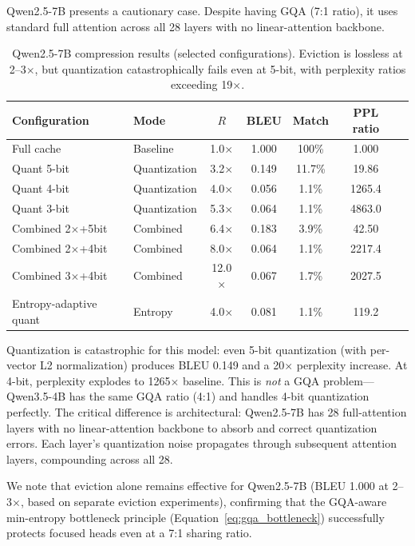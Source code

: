 \documentclass[11pt]{article}
\begin{document}
Qwen2.5-7B presents a cautionary case.  Despite having GQA (7:1 ratio), it uses standard full attention across all 28 layers with no linear-attention backbone.

\begin{table}[htbp]
\centering
\caption{Qwen2.5-7B compression results (selected configurations).  Eviction is lossless at 2--3$\times$, but quantization catastrophically fails even at 5-bit, with perplexity ratios exceeding 19$\times$.}
\label{tab:qwen25_results}
\begin{tabular}{@{}llccccc@{}}
\toprule
Configuration & Mode & $R$ & BLEU & Match & PPL ratio \\
\midrule
Full cache & Baseline & 1.0$\times$ & 1.000 & 100\% & 1.000 \\
Quant 5-bit & Quantization & 3.2$\times$ & 0.149 & 11.7\% & 19.86 \\
Quant 4-bit & Quantization & 4.0$\times$ & 0.056 & 1.1\% & 1265.4 \\
Quant 3-bit & Quantization & 5.3$\times$ & 0.064 & 1.1\% & 4863.0 \\
Combined 2$\times$+5bit & Combined & 6.4$\times$ & 0.183 & 3.9\% & 42.50 \\
Combined 2$\times$+4bit & Combined & 8.0$\times$ & 0.064 & 1.1\% & 2217.4 \\
Combined 3$\times$+4bit & Combined & 12.0$\times$ & 0.067 & 1.7\% & 2027.5 \\
Entropy-adaptive quant & Entropy & 4.0$\times$ & 0.081 & 1.1\% & 119.2 \\
\bottomrule
\end{tabular}
\end{table}

Quantization is catastrophic for this model: even 5-bit quantization (with per-vector L2 normalization) produces BLEU 0.149 and a 20$\times$ perplexity increase.  At 4-bit, perplexity explodes to 1265$\times$ baseline.  This is \emph{not} a GQA problem---Qwen3.5-4B has the same GQA ratio (4:1) and handles 4-bit quantization perfectly.  The critical difference is architectural: Qwen2.5-7B has 28 full-attention layers with no linear-attention backbone to absorb and correct quantization errors.  Each layer's quantization noise propagates through subsequent attention layers, compounding across all 28.

We note that eviction alone remains effective for Qwen2.5-7B (BLEU 1.000 at 2--3$\times$, based on separate eviction experiments), confirming that the GQA-aware min-entropy bottleneck principle (Equation~\ref{eq:gqa_bottleneck}) successfully protects focused heads even at a 7:1 sharing ratio.
\end{document}
